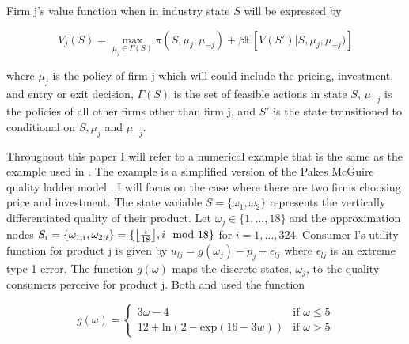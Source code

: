 \documentclass[12pt]{article}
\DeclarePairedDelimiter\floor{\lfloor}{\rfloor}
\begin{document}

Firm j's value function when in industry state $S$ will be expressed by

\begin{equation*}
  V_j(S)=\max_{\mu_j \in \Gamma(S)} \pi(S, \mu_j, \mu_{-j}) + \beta\mathbb{E}[V(S')|S,\mu_{j},\mu_{-j})]
\end{equation*}

where $\mu_j$ is the policy of firm j which will could include the pricing, investment, and entry or exit decision, $\Gamma(S)$ is the set of feasible actions in state $S$, $\mu_{-j}$ is the policies of all other firms other than firm j, and $S'$ is the state transitioned to conditional on $S,\mu_{j}$ and $\mu_{-j}$.

Throughout this paper I will refer to a numerical example that is the same as the example used in \citet{2012_Doraszelski_Judd_QuanEcon}. The example is a simplified version of the Pakes McGuire quality ladder model \citep{2012_Doraszelski_Judd_QuanEcon}. I will focus on the case where there are two firms choosing price and investment. The state variable $S=\{\omega_1,\omega_2\}$ represents the vertically differentiated quality of their product. Let $\omega_j \in \{1, \dots ,18 \}$ and the approximation nodes $S_i=\{\omega_{1,i},\omega_{2,i}\}=\{\floor*{\frac{i}{18}},i \mod 18\}$ for $i=1,\dots,324$. Consumer l's utility function for product j is given by $u_{lj}=g(\omega_j) - p_j + \epsilon_{lj}$ where $\epsilon_{lj}$ is an extreme type 1 error. The function $g(\omega)$ maps the discrete states, $\omega_j$, to the quality consumers perceive for product j. Both \citet{1992_Pakes_McGuire_NBER} and \citet{2012_Doraszelski_Judd_QuanEcon} used the function

\begin{equation*}
  g(\omega) =
  \begin{cases}
    3\omega-4 & \text{if } \omega \leq 5\\
    12+\text{ln}(2-\text{exp}(16-3w)) & \text{if } \omega >5
  \end{cases}
\end{equation*}
\end{document}
